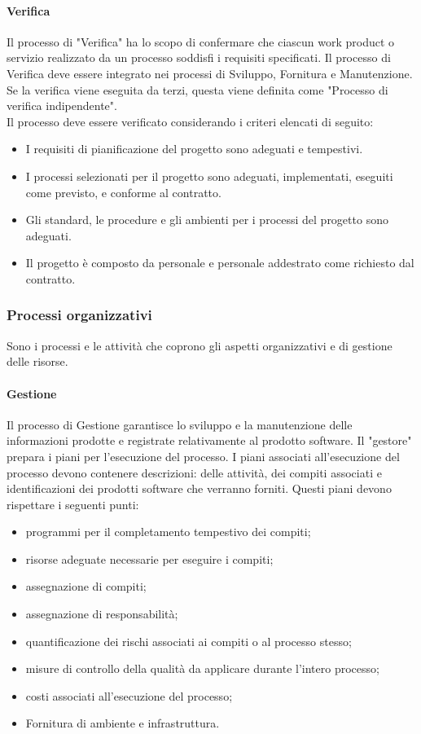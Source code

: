 \paragraph{Verifica}
Il processo di "Verifica" ha lo scopo di confermare che ciascun work product o servizio realizzato da un processo soddisfi i requisiti specificati. 
Il processo di Verifica deve essere integrato nei processi di Sviluppo, Fornitura e Manutenzione. Se la verifica viene eseguita da terzi, questa viene definita come "Processo di verifica indipendente".
\\
Il processo deve essere verificato considerando i criteri elencati di seguito:
\begin{itemize}
    \item I requisiti di pianificazione del progetto sono adeguati e tempestivi.
    \item I processi selezionati per il progetto sono adeguati, implementati, eseguiti come previsto, e conforme al contratto.
    \item Gli standard, le procedure e gli ambienti per i processi del progetto sono adeguati.
    \item Il progetto è composto da personale e personale addestrato come richiesto dal contratto.
\end{itemize}

\subsubsection{Processi organizzativi}
Sono i processi e le attività che coprono gli aspetti organizzativi e di gestione delle risorse.

\paragraph{Gestione}
Il processo di Gestione garantisce lo sviluppo e la manutenzione delle informazioni prodotte e registrate relativamente 
al prodotto software. Il "gestore" prepara i piani per l'esecuzione del processo.
I piani associati all'esecuzione del processo devono contenere descrizioni: delle attività, dei compiti associati e
identificazioni dei prodotti software che verranno forniti. Questi piani devono rispettare i seguenti punti:
\begin{itemize}
    \item programmi per il completamento tempestivo dei compiti;
    \item risorse adeguate necessarie per eseguire i compiti;
    \item assegnazione di compiti;
    \item assegnazione di responsabilità;
    \item quantificazione dei rischi associati ai compiti o al processo stesso;
    \item misure di controllo della qualità da applicare durante l'intero processo;
    \item costi associati all'esecuzione del processo;
    \item Fornitura di ambiente e infrastruttura.
\end{itemize}
